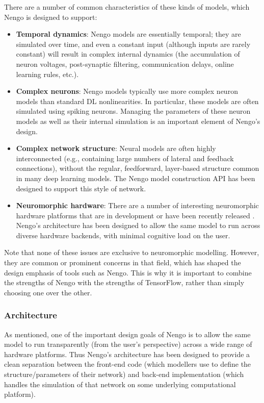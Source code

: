 \documentclass{article}
\begin{document}
There are a number of common characteristics of these kinds of models, which Nengo is designed to support:

\begin{itemize}
\item {\bf Temporal dynamics}: Nengo models are essentially temporal; they are simulated over time, and even a constant input (although inputs are rarely constant) will result in complex internal dynamics (the accumulation of neuron voltages, post-synaptic filtering, communication delays, online learning rules, etc.).
\item {\bf Complex neurons}: Nengo models typically use more complex neuron models than standard DL nonlinearities. In particular, these models are often simulated using spiking neurons.  Managing the parameters of these neuron models as well as their internal simulation is an important element of Nengo's design.
\item {\bf Complex network structure}: Neural models are often highly interconnected (e.g., containing large numbers of lateral and feedback connections), without the regular, feedforward, layer-based structure common in many deep learning models.  The Nengo model construction API has been designed to support this style of network.
\item {\bf Neuromorphic hardware}: There are a number of interesting neuromorphic hardware platforms that are in development or have been recently released \citep[e.g.,][]{Khan2008,Benjamin2014,Davies2018}.  Nengo's architecture has been designed to allow the same model to run across diverse hardware backends, with minimal cognitive load on the user.
\end{itemize}

Note that none of these issues are exclusive to neuromorphic modelling.  However, they are common or prominent concerns in that field, which has shaped the design emphasis of tools such as Nengo.  This is why it is important to combine the strengths of Nengo with the strengths of TensorFlow, rather than simply choosing one over the other.

\subsubsection{Architecture}

As mentioned, one of the important design goals of Nengo is to allow the same model to run transparently (from the user's perspective) across a wide range of hardware platforms.  Thus Nengo's architecture has been designed to provide a clean separation between the front-end code (which modellers use to define the structure/parameters of their network) and back-end implementation (which handles the simulation of that network on some underlying computational platform).  
\end{document}
